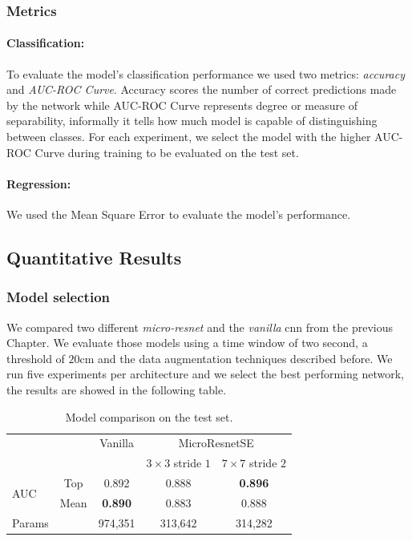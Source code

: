 \documentclass[../document.tex]{subfiles}
\begin{document}
\subsubsection{Metrics}

\paragraph{Classification:} To evaluate the model's classification performance we used two metrics: \emph{accuracy} and \emph{AUC-ROC Curve}. Accuracy scores the number of correct predictions made by the network while AUC-ROC Curve represents degree or measure of separability, informally it tells how much model is capable of distinguishing between classes. For each experiment, we select the model with the higher AUC-ROC Curve during training to be evaluated on the test set.



\paragraph{Regression:} We used the Mean Square Error to evaluate the model's performance.
\subsection{Quantitative Results}
\subsubsection{Model selection}
We compared two different \emph{micro-resnet} and the \emph{vanilla} cnn from the previous Chapter. We evaluate those models using a time window of two second, a threshold of $20$cm and the data augmentation techniques described before. We run five experiments per architecture and we select the best performing network, the results are showed in the following table. 

\begin{table}[h]
  \centering
  \begin{tabular}{@{}lcccc@{}}
  \toprule
   && Vanilla & \multicolumn{2}{c}{MicroResnetSE} \\
  \cline{3-5}
  && & $3\times 3$ stride $1$ & $7\times7$ stride $2$\\ 
  \cline{3-5}
  \multirow{2}{*}{AUC} & Top & 0.892 & 0.888 & \textbf{0.896}\\
   & Mean & \textbf{0.890} & 0.883 & 0.888\\
  \cline{1-5}
  Params & & 974,351 & 313,642 & 314,282  \\
  \bottomrule   
\end{tabular}
\caption{Model comparison on the test set.}
\end{table}
\end{document}
